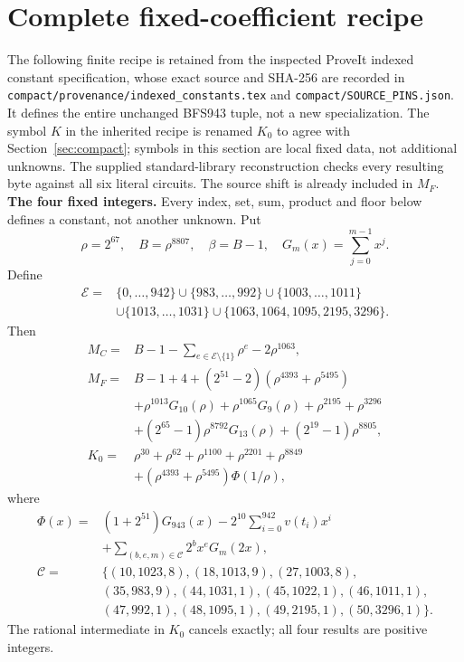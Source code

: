 \section{Complete fixed-coefficient recipe}\label{sec:compact-constants}
The following finite recipe is retained from the inspected ProveIt indexed
constant specification, whose exact source and SHA-256 are recorded in
\texttt{compact/provenance/indexed\_constants.tex} and
\texttt{compact/SOURCE\_PINS.json}. It defines the entire unchanged
BFS943 tuple, not a new specialization. The symbol $K$ in the inherited
recipe is renamed $K_0$ to agree with Section~\ref{sec:compact}; symbols
in this section are local fixed data, not additional unknowns. The supplied
standard-library reconstruction checks every resulting byte against all
six literal circuits. The source shift is already included in $M_F$.
\begingroup
\providecommand{\fl}[1]{\left\lfloor#1\right\rfloor}
\providecommand{\rg}[2]{\{#1,\ldots,#2\}}
\textbf{The four fixed integers.}
Every index, set, sum, product and floor below defines a constant, not
another unknown. Put
\[
\rho=2^{67},\quad B=\rho^{8807},\quad\beta=B-1,\quad
G_m(x)=\sum_{j=0}^{m-1}x^j.
\]
Define
\[
\begin{split}
\mathcal E={}&\rg0{942}\cup\rg{983}{992}\cup\rg{1003}{1011}\\
&\cup\rg{1013}{1031}\cup\{1063,1064,1095,2195,3296\}.
\end{split}
\]
Then
\begin{align*}
M_C={}&B-1-\sum_{e\in\mathcal E\setminus\{1\}}\rho^e-2\rho^{1063},\\
M_F={}&B-1+4+(2^{51}-2)(\rho^{4393}+\rho^{5495})\\
&+\rho^{1013}G_{10}(\rho)+\rho^{1065}G_9(\rho)
  +\rho^{2195}+\rho^{3296}\\
&+(2^{65}-1)\rho^{8792}G_{13}(\rho)+(2^{19}-1)\rho^{8805},\\
K_0={}&\rho^{30}+\rho^{62}+\rho^{1100}+\rho^{2201}+\rho^{8849}\\
&+(\rho^{4393}+\rho^{5495})\Phi(1/\rho),
\end{align*}
where
\[
\begin{split}
\Phi(x)={}&(1+2^{51})G_{943}(x)
 -2^{10}\sum_{i=0}^{942}v(t_i)x^i\\
&+\sum_{(b,e,m)\in\mathcal C}2^b x^e G_m(2x),\\
\mathcal C={}&\{(10,1023,8),(18,1013,9),(27,1003,8),\\
&(35,983,9),(44,1031,1),(45,1022,1),(46,1011,1),\\
&(47,992,1),(48,1095,1),(49,2195,1),(50,3296,1)\}.
\end{split}
\]
The rational intermediate in $K_0$ cancels exactly; all four results are positive integers.

